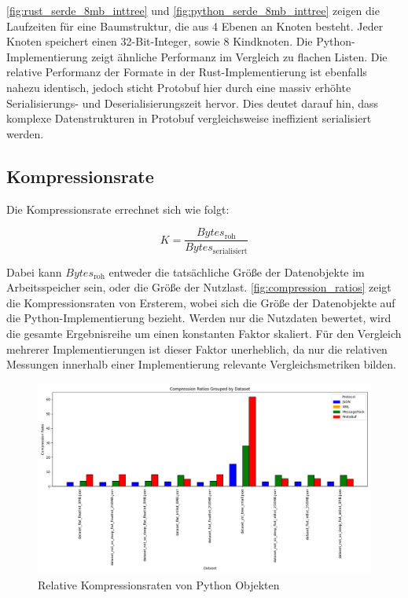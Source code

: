 \documentclass[ngerman]{seminarvorlage}
\begin{document}
\autoref{fig:rust_serde_8mb_inttree} und \autoref{fig:python_serde_8mb_inttree} zeigen die Laufzeiten für eine Baumstruktur, die aus 4 Ebenen an Knoten besteht. Jeder Knoten speichert einen 32-Bit-Integer, sowie 8 Kindknoten. Die Python-Implementierung zeigt ähnliche Performanz im Vergleich zu flachen Listen. Die relative Performanz der Formate in der Rust-Implementierung ist ebenfalls nahezu identisch, jedoch sticht Protobuf hier durch eine massiv erhöhte Serialisierungs- und Deserialisierungszeit hervor. Dies deutet darauf hin, dass komplexe Datenstrukturen in Protobuf vergleichsweise ineffizient serialisiert werden.


\subsection{Kompressionsrate}

Die Kompressionsrate errechnet sich wie folgt:

$$ K = \frac{Bytes_\text{roh}}{Bytes_\text{serialisiert}} $$

Dabei kann $ Bytes_\text{roh} $ entweder die tatsächliche Größe der Datenobjekte im Arbeitsspeicher sein, oder die Größe der Nutzlast. \autoref{fig:compression_ratios} zeigt die Kompressionsraten von Ersterem, wobei sich die Größe der Datenobjekte auf die Python-Implementierung bezieht. Werden nur die Nutzdaten bewertet, wird die gesamte Ergebnisreihe um einen konstanten Faktor skaliert. Für den Vergleich mehrerer Implementierungen ist dieser Faktor unerheblich, da nur die relativen Messungen innerhalb einer Implementierung relevante Vergleichsmetriken bilden.

\begin{figure}[t] %
  \centering
  \includegraphics[width=\textwidth]{images/graphs/combined_compression_ratios.png} %
  \caption{Relative Kompressionsraten von Python Objekten}
  \label{fig:compression_ratios}
\end{figure}
\end{document}
